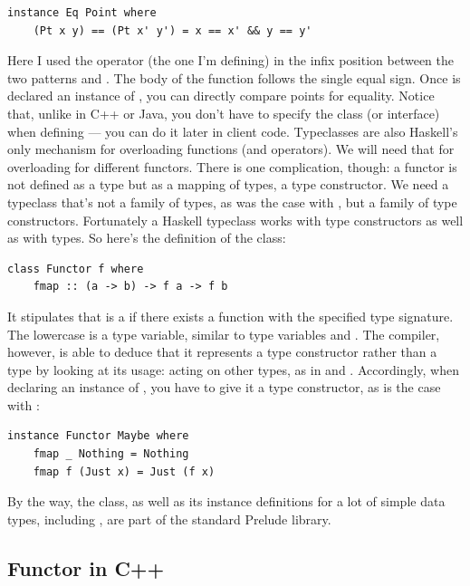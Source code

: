 \begin{Verbatim}[commandchars=\\\{\}]
instance Eq Point where
    (Pt x y) == (Pt x' y') = x == x' && y == y'
\end{Verbatim}
Here I used the operator \code{(==)} (the one I'm defining) in the
infix position between the two patterns  and
. The body of the function follows the
single equal sign. Once  is declared an instance of
, you can directly compare points for equality. Notice that,
unlike in C++ or Java, you don't have to specify the  class
(or interface) when defining  --- you can do it later in
client code. Typeclasses are also Haskell's only mechanism for
overloading functions (and operators). We will need that for overloading
 for different functors. There is one complication, though:
a functor is not defined as a type but as a mapping of types, a type
constructor. We need a typeclass that's not a family of types, as was
the case with , but a family of type constructors.
Fortunately a Haskell typeclass works with type constructors as well as
with types. So here's the definition of the  class:

\begin{Verbatim}[commandchars=\\\{\}]
class Functor f where
    fmap :: (a -> b) -> f a -> f b
\end{Verbatim}
It stipulates that  is a  if there exists a
function  with the specified type signature. The lowercase
 is a type variable, similar to type variables  and
. The compiler, however, is able to deduce that it represents
a type constructor rather than a type by looking at its usage: acting on
other types, as in  and . Accordingly, when
declaring an instance of , you have to give it a type
constructor, as is the case with :

\begin{Verbatim}[commandchars=\\\{\}]
instance Functor Maybe where
    fmap _ Nothing = Nothing
    fmap f (Just x) = Just (f x)
\end{Verbatim}
By the way, the  class, as well as its instance
definitions for a lot of simple data types, including ,
are part of the standard Prelude library.

\subsection{Functor in C++}\label{functor-in-c}

